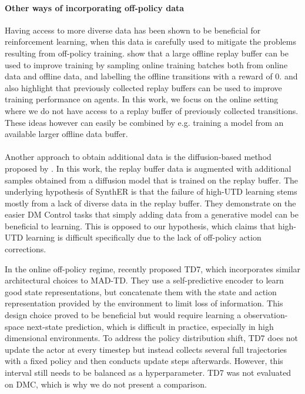 \paragraph{Other ways of incorporating off-policy data} Having access to more diverse data has been shown to be beneficial for reinforcement learning, when this data is carefully used to mitigate the problems resulting from off-policy training.
\textcite{ball2023efficient} show that a large offline replay buffer can be used to improve training by sampling online training batches both from online data and offline data, and labelling the offline transitions with a reward of 0.
\textcite{agarwal2022reincarnating} and \textcite{tirumala2024replay} also highlight that previously collected replay buffers can be used to improve training performance on agents.
In this work, we focus on the online setting where we do not have access to a replay buffer of previously collected transitions.
These ideas however can easily be combined by e.g. training a model from an available larger offline data buffer.

\paragraph{} Another  approach to obtain additional data is the diffusion-based method proposed by \textcite{lu2024synthetic}.
In this work, the replay buffer data is augmented with additional samples obtained from a diffusion model that is trained on the replay buffer.
The underlying hypothesis of SynthER is that the failure of high-UTD learning stems mostly from a lack of diverse data in the replay buffer. 
They demonstrate on the easier DM Control tasks that simply adding data from a generative model can be beneficial to learning. 
This is opposed to our hypothesis, which claims that high-UTD learning is difficult specifically due to the lack of off-policy action corrections.

In the online off-policy regime, \textcite{fujimoto2024sale} recently proposed TD7, which incorporates similar architectural choices to MAD-TD.
They use a self-predictive encoder to learn good state representations, but concatenate them with the state and action representation provided by the environment to limit loss of information.
This design choice proved to be beneficial but would require learning a observation-space next-state prediction, which is difficult in practice, especially in high dimensional environments.
To address the policy distribution shift, TD7 does not update the actor at every timestep but instead collects several full trajectories with a fixed policy and then conducts update steps afterwards.
However, this interval still needs to be balanced as a hyperparameter.
TD7 was not evaluated on DMC, which is why we do not present a comparison.


